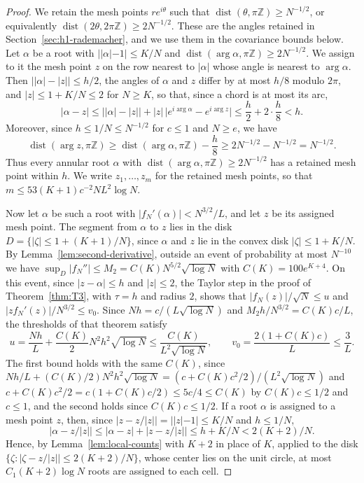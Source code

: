\begin{proof}
We retain the mesh points $re^{i\theta}$ such that
$\operatorname{dist}(\theta,\pi\mathbb Z)\ge N^{-1/2}$, or equivalently
$\operatorname{dist}(2\theta,2\pi\mathbb Z)\ge2N^{-1/2}$. These are the
angles retained in Section~\ref{sec:h1-rademacher}, and we use them in the
covariance bounds below. Let $\alpha$ be a root with $||\alpha|-1|\le K/N$
and $\operatorname{dist}(\arg\alpha,\pi\mathbb Z)\ge2N^{-1/2}$. We assign
to it the mesh point $z$ on the row nearest to $|\alpha|$ whose angle is
nearest to $\arg\alpha$. Then $\bigl||\alpha|-|z|\bigr|\le h/2$, the angles
of $\alpha$ and $z$ differ by at most $h/8$ modulo $2\pi$, and
$|z|\le1+K/N\le2$ for $N\ge K$, so that, since a chord is at most its arc,
\[
 |\alpha-z|\le\bigl||\alpha|-|z|\bigr|
   +|z|\,\bigl|e^{i\arg\alpha}-e^{i\arg z}\bigr|
 \le\frac h2+2\cdot\frac h8<h.
\]
Moreover, since $h\le1/N\le N^{-1/2}$ for $c\le1$ and $N\ge e$, we have
\[
 \operatorname{dist}(\arg z,\pi\mathbb Z)
 \ge\operatorname{dist}(\arg\alpha,\pi\mathbb Z)-\frac h8
 \ge2N^{-1/2}-N^{-1/2}=N^{-1/2}.
\]
Thus every annular root $\alpha$ with
$\operatorname{dist}(\arg\alpha,\pi\mathbb Z)\ge2N^{-1/2}$ has a retained
mesh point within $h$.
We write $z_1,\ldots,z_m$ for the retained mesh points, so that
$m\le53(K+1)c^{-2}NL^2\log N$.

Now let $\alpha$ be such a root with $|f_N'(\alpha)|<N^{3/2}/L$, and let
$z$ be its assigned mesh point. The segment from $\alpha$ to $z$ lies in
the disk $D=\{|\zeta|\le1+(K+1)/N\}$, since $\alpha$ and $z$ lie in the
convex disk $|\zeta|\le1+K/N$. By Lemma~\ref{lem:second-derivative},
outside an event of probability at most $N^{-10}$ we have
$\sup_D|f_N''|\le M_2=C(K)N^{5/2}\sqrt{\log N}$ with $C(K)=100e^{K+4}$.
On this event, since $|z-\alpha|\le h$ and $|z|\le2$, the Taylor step in
the proof of Theorem~\ref{thm:T3}, with $\tau=h$ and radius $2$, shows
that $|f_N(z)|/\sqrt N\le u$ and $|zf_N'(z)|/N^{3/2}\le v_0$. Since
$Nh=c/(L\sqrt{\log N})$ and $M_2h/N^{3/2}=C(K)c/L$, the thresholds of that
theorem satisfy
\begin{equation}
 u=\frac{Nh}L+\frac{C(K)}2N^2h^2\sqrt{\log N}\le\frac{C(K)}{L^2\sqrt{\log N}},
 \qquad
 v_0=\frac{2(1+C(K)c)}L\le\frac3L.
 \label{eq:annular-mesh-test}
\end{equation}
The first bound holds with the same $C(K)$, since
$Nh/L+(C(K)/2)N^2h^2\sqrt{\log N}=(c+C(K)c^2/2)/(L^2\sqrt{\log N})$ and
$c+C(K)c^2/2=c(1+C(K)c/2)\le5c/4\le C(K)$ by $C(K)c\le1/2$ and $c\le1$,
and the second holds since $C(K)c\le1/2$.
If a root $\alpha$ is assigned to a mesh point $z$, then, since
$\bigl|z-z/|z|\bigr|=||z|-1|\le K/N$ and $h\le1/N$,
\[
 \bigl|\alpha-z/|z|\bigr|\le|\alpha-z|+\bigl|z-z/|z|\bigr|
 \le h+K/N<2(K+2)/N.
\]
Hence, by Lemma~\ref{lem:local-counts} with $K+2$ in place of $K$, applied
to the disk $\{\zeta:|\zeta-z/|z||\le2(K+2)/N\}$, whose center lies on the
unit circle, at most $C_1(K+2)\log N$ roots are assigned to each cell.


\end{proof}
